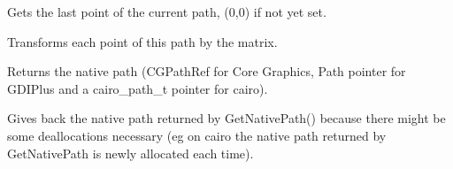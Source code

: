 Gets the last point of the current path, (0,0) if not yet set.

\label{wxgraphicspathtransform}


Transforms each point of this path by the matrix.

\label{wxgraphicspathgetnativepath}


Returns the native path (CGPathRef for Core Graphics, Path pointer for GDIPlus and a cairo\_path\_t pointer for cairo).

\label{wxgraphicspathungetnativepath}


Gives back the native path returned by GetNativePath() because there might be some deallocations necessary (eg on cairo the native path returned by 
GetNativePath is newly allocated each time).

